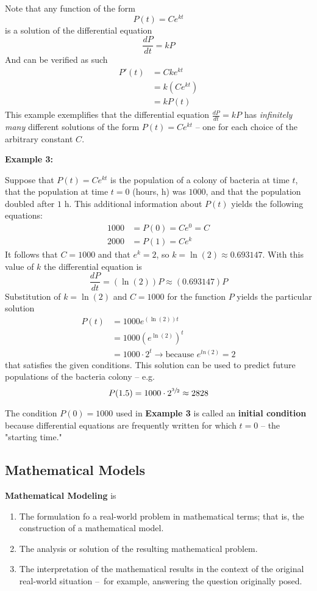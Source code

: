 \documentclass{article}
\begin{document}
Note that any function of the form
$$ P(t) = Ce^{kt} $$
is a solution of the differential equation
$$ \frac{dP}{dt} = kP $$
And can be verified as such
\begin{align*}
    P'(t) & = Cke^{kt} \\
          & = k\left(Ce^{kt}\right) \\
          & = kP(t)
\end{align*}
This example exemplifies that the differential equation $ \frac{dP}{dt} = kP $ has \textit{infinitely many} different solutions of the form $ P(t) = Ce^{kt} $ – one for each choice of the arbitrary constant $ C $.

\textbf{Example 3:}

Suppose that $ P(t) = Ce^{kt} $ is the population of a colony of bacteria at time $ t $, that the population at time $ t = 0 $ (hours, h) was $ 1000 $, and that the population doubled after $ 1 $ h. This additional information about $ P(t) $ yields the following equations:
\begin{align*}
    1000 & = P(0) = Ce^0 = C \\
    2000 & = P(1) = Ce^k
\end{align*}
It follows that $ C = 1000 $ and that $ e^k = 2 $, so $ k = \ln(2) \approx 0.693147 $. With this value of $ k $ the differential equation is
$$ \frac{dP}{dt} = (\ln(2))P \approx (0.693147)P $$
Substitution of $ k = \ln(2) $ and $ C = 1000 $ for the function $ P $ yields the particular solution
\begin{align*}
    P(t) & = 1000e^{\left(\ln(2)\right)t} \\
         & = 1000\left(e^{\ln(2)}\right)^t \\
         & = 1000 \cdot 2^t \rightarrow \text{because } e^{ln(2)} = 2
\end{align*}
that satisfies the given conditions. This solution can be used to predict future populations of the bacteria colony – e.g.
$$ P(1.5) = 1000 \cdot 2^{\sfrac{3}{2}} \approx 2828 $$

The condition $ P(0) = 1000 $ used in \textbf{Example 3} is called an \textbf{initial condition} because differential equations are frequently written for which $ t = 0 $ – the "starting time."

\subsection{Mathematical Models}

\textbf{Mathematical Modeling} is
\begin{enumerate}
    \item The formulation fo a real-world problem in mathematical terms; that is, the construction of a mathematical model.
    \item The analysis or solution of the resulting mathematical problem.
    \item The interpretation of the mathematical results in the context of the original real-world situation – for example, answering the question originally posed.
\end{enumerate}
\end{document}
